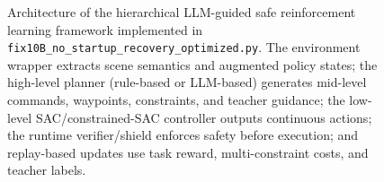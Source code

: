 \begin{figure}[t]
\caption{Architecture of the hierarchical LLM-guided safe reinforcement learning framework implemented in \texttt{fix10B\_no\_startup\_recovery\_optimized.py}. The environment wrapper extracts scene semantics and augmented policy states; the high-level planner (rule-based or LLM-based) generates mid-level commands, waypoints, constraints, and teacher guidance; the low-level SAC/constrained-SAC controller outputs continuous actions; the runtime verifier/shield enforces safety before execution; and replay-based updates use task reward, multi-constraint costs, and teacher labels.}
\label{fig:framework}
\end{figure}
